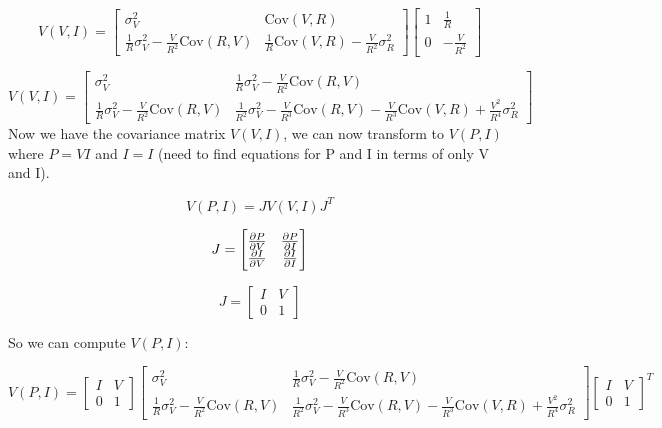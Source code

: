 \documentclass[10pt]{article}
\begin{document}
\begin{enumerate}[label=(\alph*)]
	      \[ V(V,I) = \begin{bmatrix}
			      \sigma_V^2                                           & \text{Cov}(V,R)                                      \\
			      \frac{1}{R}\sigma_V^2 - \frac{V}{R^2}\text{Cov}(R,V) & \frac{1}{R}\text{Cov}(V,R) - \frac{V}{R^2}\sigma_R^2
		      \end{bmatrix} \begin{bmatrix}
			      1 & \frac{1}{R}    \\
			      0 & -\frac{V}{R^2}
		      \end{bmatrix} \]


	      \[ V(V,I) = \begin{bmatrix} \sigma_V^2                                           & \frac{1}{R}\sigma_V^2 - \frac{V}{R^2}\text{Cov}(R,V)                                                               \\
                \frac{1}{R}\sigma_V^2 - \frac{V}{R^2}\text{Cov}(R,V) & \frac{1}{R^2} \sigma_V^2 - \frac{V}{R^3}\text{Cov}(R,V) - \frac{V}{R^3}\text{Cov}(V,R) + \frac{V^2}{R^4}\sigma_R^2
		      \end{bmatrix} \]
	      Now we have the covariance matrix $V(V,I)$, we can now transform to $V(P,I)$ where $P = V I$ and $I = I$ (need to find equations for P and I in terms of only V and I).

	      \[ V(P,I) = J V(V,I) J^T \]

	      \[ J = \begin{bmatrix}
			      \pdv{P}{V} & \pdv{P}{I} \\
			      \pdv{I}{V} & \pdv{I}{I}
		      \end{bmatrix} \]

	      \[ J = \begin{bmatrix}
			      I & V \\
			      0 & 1
		      \end{bmatrix} \]

	      So we can compute $V(P,I)$:

	      \[ V(P,I) = \begin{bmatrix}
			      I & V \\
			      0 & 1
		      \end{bmatrix}
		      \begin{bmatrix} \sigma_V^2                                           & \frac{1}{R}\sigma_V^2 - \frac{V}{R^2}\text{Cov}(R,V)                                                               \\
                \frac{1}{R}\sigma_V^2 - \frac{V}{R^2}\text{Cov}(R,V) & \frac{1}{R^2} \sigma_V^2 - \frac{V}{R^3}\text{Cov}(R,V) - \frac{V}{R^3}\text{Cov}(V,R) + \frac{V^2}{R^4}\sigma_R^2
		      \end{bmatrix} \begin{bmatrix}
			      I & V \\
			      0 & 1
		      \end{bmatrix}^T \]


\end{enumerate}
\end{document}
